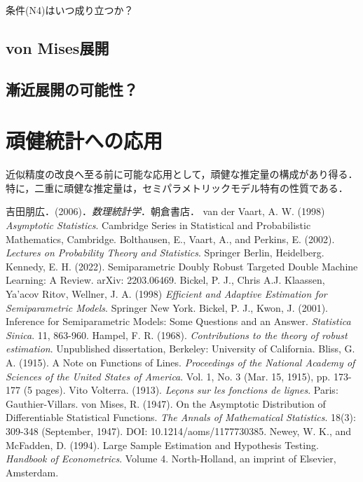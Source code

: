 \documentclass[uplatex, dvipdfmx]{jsarticle}
\begin{document}
条件(N4)はいつ成り立つか？

\subsection{von Mises展開}

\subsection{漸近展開の可能性？}

\section{頑健統計への応用}

\begin{tcolorbox}[colframe=ForestGreen, colback=ForestGreen!10!white,breakable,colbacktitle=ForestGreen!40!white,coltitle=black,fonttitle=\bfseries\sffamily,
title=]
    近似精度の改良へ至る前に可能な応用として，頑健な推定量の構成があり得る．特に，二重に頑健な推定量は，セミパラメトリックモデル特有の性質である．
\end{tcolorbox}

\begin{thebibliography}{99}
    吉田朋広．(2006)．\textit{数理統計学}．朝倉書店．
    van der Vaart, A. W. (1998) \textit{Asymptotic Statistics}. Cambridge Series in Statistical and Probabilistic Mathematics, Cambridge.
    Bolthausen, E., Vaart, A., and Perkins, E. (2002). \textit{Lectures on Probability Theory and Statistics}. Springer Berlin, Heidelberg.
    Kennedy, E. H. (2022). Semiparametric Doubly Robust Targeted Double Machine Learning: A Review. arXiv: 2203.06469.
    Bickel, P. J., Chris A.J. Klaassen, Ya'acov Ritov, Wellner, J. A. (1998) \textit{Efficient and Adaptive Estimation for Semiparametric Models}. Springer New York.
    Bickel, P. J., Kwon, J. (2001). Inference for Semiparametric Models: Some Questions and an Answer. \textit{Statistica Sinica}. 11, 863-960.
    Hampel, F. R. (1968). \textit{Contributions to the theory of robust estimation}. Unpublished dissertation, Berkeley: University of California.
    Bliss, G. A. (1915). A Note on Functions of Lines. \textit{Proceedings of the National Academy of Sciences of the United States of America}. Vol. 1, No. 3 (Mar. 15, 1915), pp. 173-177 (5 pages).
    Vito Volterra. (1913). \textit{Le\c{c}ons sur les fonctions de lignes}. Paris: Gauthier-Villars.
    von Mises, R. (1947). On the Asymptotic Distribution of Differentiable Statistical Functions. \textit{The Annals of Mathematical Statistics}. 18(3): 309-348 (September, 1947). DOI: 10.1214/aoms/1177730385.
    Newey, W. K., and McFadden, D. (1994). Large Sample Estimation and Hypothesis Testing. \textit{Handbook of Econometrics}. Volume 4. North-Holland, an imprint of Elsevier, Amsterdam.
\end{thebibliography}
\end{document}
